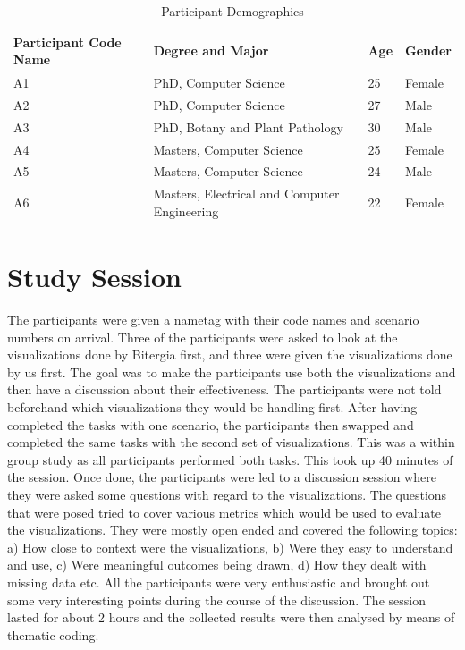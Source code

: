 \documentclass[double,12pt]{beavtex}
\begin{document}
\begin{table}
\centering
\begin{tabular}{ |p{3cm}||p{5cm}|p{3cm}|p{3cm}|  }
 \hline
Participant Code Name & Degree and Major & Age & Gender\\
 \hline
 A1 & PhD, Computer Science & 25 & Female\\
 A2 & PhD, Computer Science & 27 & Male\\
 A3 & PhD, Botany and Plant Pathology & 30 & Male\\
 A4 & Masters, Computer Science & 25 & Female\\
 A5 & Masters, Computer Science & 24 & Male\\
 A6 & Masters, Electrical and Computer Engineering & 22 & Female\\
 \hline
\end{tabular}
\caption{Participant Demographics}
\label{tab:table1}
\end{table}

\section{Study Session}
The participants were given a nametag with their code names and scenario numbers on arrival. Three of the participants were asked to look at the visualizations done by Bitergia first, and three were given the visualizations done by us first. The goal was to make the participants use both the visualizations and then have a discussion about their effectiveness. The participants were not told beforehand which visualizations they would be handling first. After having completed the tasks with one scenario, the participants then swapped and completed the same tasks with the second set of visualizations. This was a within group study as all participants performed both tasks. This took up 40 minutes of the session. Once done, the participants were led to a discussion session where they were asked some questions with regard to the visualizations. The questions that were posed tried to cover various metrics which would be used to evaluate the visualizations. They were mostly open ended and covered the following topics: a) How close to context were the visualizations, b) Were they easy to understand and use, c) Were meaningful outcomes being drawn, d) How they dealt with missing data etc. All the participants were very enthusiastic and brought out some very interesting points during the course of the discussion. The session lasted for about 2 hours and the collected results were then analysed by means of thematic coding.
\end{document}
